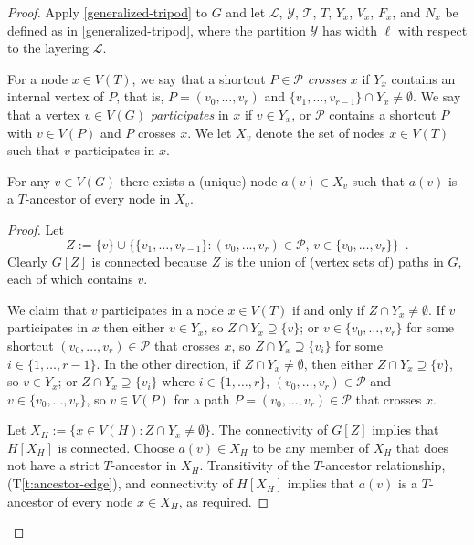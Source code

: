 \documentclass{patmorin}
\newcommand{\tref}[1]{(T\ref{t:#1})}
\newcommand{\PP}{\mathcal{P}}
\begin{document}
\begin{proof}
Apply \cref{generalized-tripod} to $G$ and let $\mathcal{L}$, $\mathcal{Y}$, $\mathcal{T}$, $T$, $Y_x$, $V_x$, $F_x$, and $N_x$ be defined as in \cref{generalized-tripod}, where the partition $\mathcal{Y}$ has width $\ell$ with respect to the layering $\mathcal{L}$.

For a node $x\in V(T)$, we say that a shortcut $P\in\mathcal{P}$ \emph{crosses} $x$ if $Y_x$ contains an internal vertex of $P$, that is, $P=(v_0,\ldots,v_r)$ and $\{v_1,\ldots,v_{r-1}\}\cap Y_x\neq\emptyset$.  We say that a vertex $v\in V(G)$ \emph{participates} in $x$ if $v\in Y_x$, or $\mathcal{P}$ contains a shortcut $P$ with $v\in V(P)$ and $P$ crosses $x$. We let $X_v$ denote the set of nodes $x\in V(T)$ such that $v$ participates in $x$.

\begin{clm}\label{x-v-ancestor}
  For any $v\in V(G)$ there exists a (unique) node $a(v)\in X_v$ such that
  $a(v)$ is a $T$-ancestor of every node in $X_v$.
\end{clm}

\begin{proof}
  Let 
  \[
     Z := \{v\} \cup \{\{v_1,\ldots,v_{r-1}\}:\mbox{$(v_0,\ldots,v_r)\in\mathcal{P}$, $v\in \{v_0,\ldots,v_r\}$}\} \enspace .
  \]
  Clearly $G[Z]$ is connected because $Z$ is the union of (vertex sets of) paths in $G$, each of which contains $v$. 
  
  We claim that $v$ participates in a node $x\in V(T)$ if and only if $Z\cap Y_x\neq\emptyset$.  If $v$ participates in $x$ then either $v\in Y_x$, so $Z\cap Y_x\supseteq\{v\}$; or $v\in \{v_0,\ldots,v_r\}$ for some shortcut $(v_0,\ldots,v_r)\in\mathcal{P}$ that crosses $x$, so $Z\cap Y_x\supseteq \{v_i\}$ for some $i\in\{1,\ldots,r-1\}$.  In the other direction, if $Z\cap Y_x\neq\emptyset$, then either $Z\cap Y_x\supseteq \{v\}$, so $v\in Y_x$; or $Z\cap Y_x\supseteq \{v_i\}$ where $i\in\{1,\ldots,r\}$, $(v_0,\ldots,v_r)\in\PP$ and $v\in\{v_0,\ldots,v_r\}$, so $v\in V(P)$ for a path $P=(v_0,\ldots,v_r)\in\mathcal{P}$ that crosses $x$. 

  Let $X_H:=\{x\in V(H): Z\cap Y_x\neq\emptyset\}$.  The connectivity of $G[Z]$ implies that $H[X_H]$ is connected.  
  Choose $a(v)\in X_H$ to be any member of $X_H$ that does not have a strict $T$-ancestor in $X_H$.  Transitivity of the $T$-ancestor relationship, \tref{ancestor-edge}, and connectivity of $H[X_H]$ implies that $a(v)$ is a $T$-ancestor of every node $x\in X_H$, as required.
\end{proof}


\end{proof}
\end{document}
